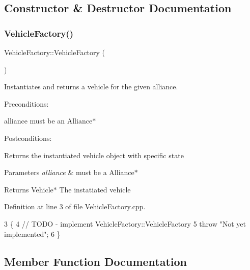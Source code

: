 \subsection{Constructor \& Destructor Documentation}
\mbox{\label{classVehicleFactory_ad20e739afc40f61315fb842773df8498}} 
\subsubsection{\texorpdfstring{Vehicle\+Factory()}{VehicleFactory()}}
{\footnotesize\ttfamily Vehicle\+Factory\+::\+Vehicle\+Factory (\begin{DoxyParamCaption}{ }\end{DoxyParamCaption})}



Instantiates and returns a vehicle for the given alliance. 

Preconditions\+:
\begin{DoxyItemize}
\item alliance must be an Alliance$\ast$
\end{DoxyItemize}

Postconditions\+:
\begin{DoxyItemize}
\item Returns the instantiated vehicle object with specific state
\end{DoxyItemize}


\begin{DoxyParams}{Parameters}
{\em alliance} & must be a Alliance$\ast$ \\
\hline
\end{DoxyParams}
\begin{DoxyReturn}{Returns}
Vehicle$\ast$ The instatiated vehicle 
\end{DoxyReturn}


Definition at line 3 of file Vehicle\+Factory.\+cpp.


\begin{DoxyCode}
3                                \{
4     \textcolor{comment}{// TODO - implement VehicleFactory::VehicleFactory}
5     \textcolor{keywordflow}{throw} \textcolor{stringliteral}{"Not yet implemented"};
6 \}
\end{DoxyCode}


\subsection{Member Function Documentation}
\mbox{\label{classVehicleFactory_a6d874e37b573b491a49e303209ac42cd}} 
